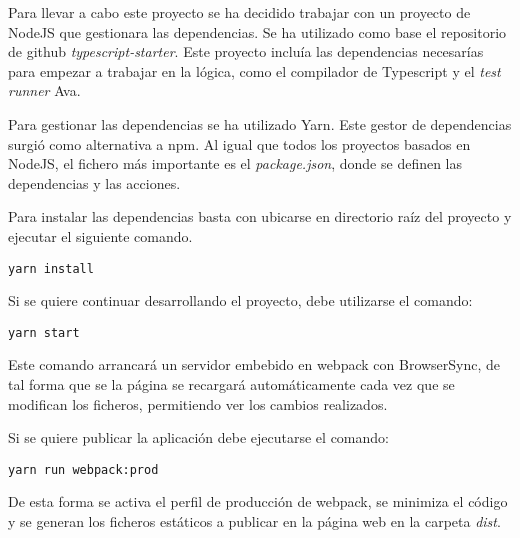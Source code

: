 Para llevar a cabo este proyecto se ha decidido trabajar con un proyecto de NodeJS que gestionara
las dependencias. Se ha utilizado como base el repositorio de github \textit{typescript-starter}.\cite{TypescriptStarter}
Este proyecto incluía las dependencias necesarías para empezar a trabajar en la lógica, como 
el compilador de Typescript y el \textit{test runner} Ava.

\bigskip
Para gestionar las dependencias se ha utilizado Yarn\cite{yarn}. Este gestor de dependencias surgió
como alternativa a npm\cite{npm}. Al igual que todos los proyectos basados en NodeJS, el fichero
más importante es el \textit{package.json}, donde se definen las dependencias y las acciones.

\bigskip
Para instalar las dependencias basta con ubicarse en directorio raíz del proyecto y ejecutar el siguiente
comando.

\begin{lstlisting}
yarn install
\end{lstlisting}

\bigskip
Si se quiere continuar desarrollando el proyecto, debe utilizarse el comando: 
\begin{lstlisting}
yarn start
\end{lstlisting}

Este comando arrancará un servidor embebido en webpack con BrowserSync, de tal forma que se la 
página se recargará automáticamente cada vez que se modifican los ficheros, 
permitiendo ver los cambios realizados.

\bigskip
Si se quiere publicar la aplicación debe ejecutarse el comando:
\begin{lstlisting}
yarn run webpack:prod
\end{lstlisting}

De esta forma se activa el perfil de producción de webpack, se minimiza el código y se generan 
los ficheros estáticos a publicar en la página web en la carpeta \textit{dist}.

